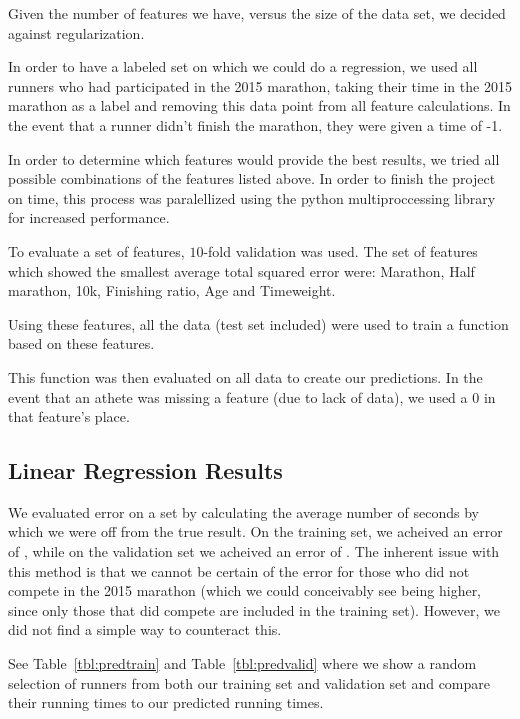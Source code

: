\documentclass{article}
\begin{document}
Given the number of features we have, versus the size of the data set, we decided against regularization.

In order to have a labeled set on which we could do a regression, we used all runners who had participated in the 2015 marathon,
taking their time in the 2015 marathon as a label and removing this data point from all feature calculations. 
In the event that a runner didn't finish the marathon, they were given a time of -1.

In order to determine which features would provide the best results, we tried all possible combinations
of the features listed above. In order to finish the project on time, this process was paralellized using 
the python multiproccessing library for increased performance.

To evaluate a set of features, $10$-fold validation was used. The set of features which showed the smallest
average total squared error were: Marathon, Half marathon, 10k, Finishing ratio, Age and Timeweight.

Using these features, all the data (test set included) were used to train a function based on these features.

This function was then evaluated on all data to create our predictions. In the event that an athete was missing a feature (due to lack of data),
we used a $0$ in that feature's place.


\subsection*{Linear Regression Results}


We evaluated error on a set by calculating the average number of seconds by which we were off 
from the true result.
On the training set, we acheived an error of , while on the validation set we acheived an error of .
The inherent issue with this method is that we cannot be certain of the error for those who did not compete 
in the 2015 marathon (which we could conceivably see being higher, since only those that did compete
are included in the training set). However, we did not find a simple way to counteract this.


See Table~\ref{tbl:predtrain} and Table~\ref{tbl:predvalid} where we show a random selection of 
runners from both our training set and validation set and compare their running times to our predicted running times. 
\end{document}
